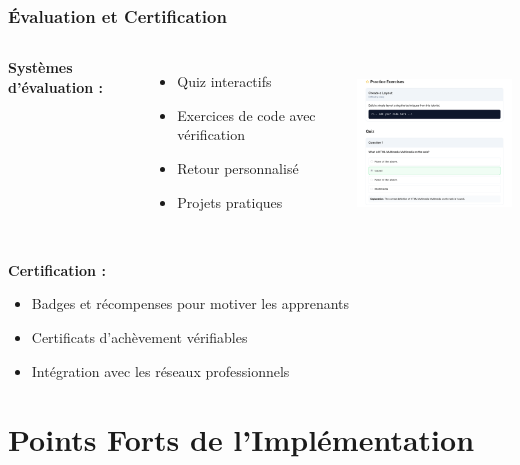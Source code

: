 \documentclass{beamer}
\begin{document}
\begin{frame}
\frametitle{Évaluation et Certification}
\begin{columns}
\textbf{Systèmes d'évaluation :}
\begin{itemize}
    \item Quiz interactifs
    \item Exercices de code avec vérification
    \item Retour personnalisé
    \item Projets pratiques
\end{itemize}

\begin{center}
    \includegraphics[width=\textwidth,height=4.5cm,keepaspectratio]{week_3_img/part2.png}
\end{center}
\end{columns}

\vspace{0.3cm}
\textbf{Certification :}
\begin{itemize}
    \item Badges et récompenses pour motiver les apprenants
    \item Certificats d'achèvement vérifiables
    \item Intégration avec les réseaux professionnels
\end{itemize}
\end{frame}

\section{Points Forts de l'Implémentation}
\end{document}
